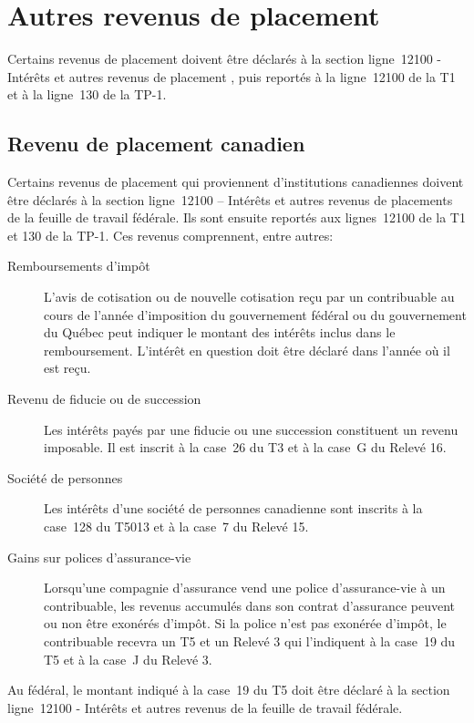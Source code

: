 \section{Autres revenus de placement}
\begin{intro}
	Certains revenus de placement doivent être déclarés à la section \og ligne~12100 - Intérêts et autres revenus de placement \fg{}, puis reportés à la ligne~12100 de la T1 et à la ligne~130 de la TP-1.
\end{intro}


\subsection{Revenu de placement canadien}
Certains revenus de placement qui proviennent d'institutions canadiennes doivent être déclarés à la section ligne~12100 – Intérêts et autres revenus de placements de la feuille de travail fédérale. Ils sont ensuite reportés aux lignes~12100 de la T1 et 130 de la TP-1. Ces revenus comprennent, entre autres:
\begin{description}
	\item[Remboursements d'impôt] L'avis de cotisation ou de nouvelle cotisation reçu par un contribuable au cours de l'année d'imposition du gouvernement fédéral ou du gouvernement du Québec peut indiquer le montant des intérêts inclus dans le remboursement. L'intérêt en question doit être déclaré dans l'année où il est reçu.
	\item[Revenu de fiducie ou de succession] Les intérêts payés par une fiducie ou une succession constituent un revenu imposable. Il est inscrit à la case~26 du T3 et à la case~G du Relevé 16.
	\item[Société de personnes] Les intérêts d'une société de personnes canadienne sont inscrits à la case~128 du T5013 et à la case~7 du Relevé 15.
	\item[Gains sur polices d'assurance-vie] Lorsqu'une compagnie d'assurance vend une police d'assurance-vie à un contribuable, les revenus accumulés dans son contrat d'assurance peuvent ou non être exonérés d'impôt. Si la police n'est pas exonérée d'impôt, le contribuable recevra un T5 et un Relevé 3 qui l'indiquent à la case~19 du T5 et à la case~J du Relevé 3.
\end{description}

Au fédéral, le montant indiqué à la case~19 du T5 doit être déclaré à la section \og ligne~12100 - Intérêts et autres revenus \fg{} de la feuille de travail fédérale.

